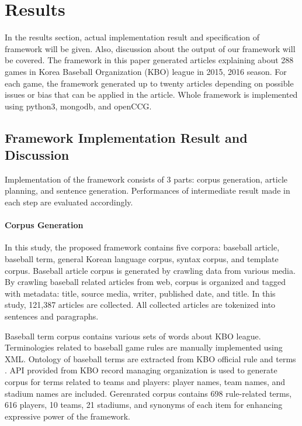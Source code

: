 \documentclass{sig-alternate}
\begin{document}
\section{Results} 

In the results section, actual implementation result and specification of framework will be given. Also, discussion about the output of our framework will be covered. The framework in this paper generated articles explaining about 288 games in Korea Baseball Organization (KBO) league in 2015, 2016 season. For each game, the framework generated up to twenty articles depending on possible issues or bias that can be applied in the article. Whole framework is implemented using python3, mongodb, and openCCG. 

\subsection{Framework Implementation Result and Discussion}

Implementation of the framework consists of 3 parts: corpus generation, article planning, and sentence generation. Performances of intermediate result made in each step are evaluated accordingly. 

\paragraph{Corpus Generation} 

In this study, the proposed framework contains five corpora: baseball article, baseball term, general Korean language corpus, syntax corpus, and template corpus. 
Baseball article corpus is generated by crawling data from various media. By crawling baseball related articles from web, corpus is organized and tagged with metadata: title, source media, writer, published date, and title. In this study, 121,387 articles are collected. All collected articles are tokenized into sentences and paragraphs. 

Baseball term corpus contains various sets of words about KBO league. Terminologies related to baseball game rules are manually implemented using XML. Ontology of baseball terms are extracted from KBO official rule and terms \cite{kbo}.  API provided from KBO record managing organization is used to generate corpus for terms related to teams and players: player names, team names, and stadium names are included. Gerenrated corpus contains 698 rule-related terms, 616 players, 10 teams, 21 stadiums, and synonyms of each item for enhancing expressive power of the framework. 
\end{document}
